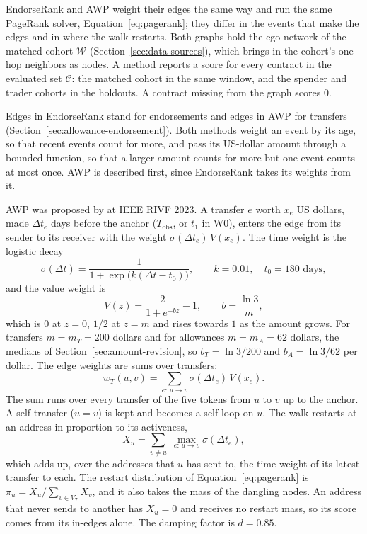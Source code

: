 
EndorseRank and AWP weight their edges the same way and run the same PageRank solver, Equation~\eqref{eq:pagerank}; they differ in the events that make the edges and in where the walk restarts. Both graphs hold the ego network of the matched cohort $\mathcal{W}$ (Section~\ref{sec:data-sources}), which brings in the cohort's one-hop neighbors as nodes. A method reports a score for every contract in the evaluated set $\mathcal{C}$: the matched cohort in the same window, and the spender and trader cohorts in the holdouts. A contract missing from the graph scores $0$.

Edges in EndorseRank stand for endorsements and edges in AWP for transfers (Section~\ref{sec:allowance-endorsement}). Both methods weight an event by its age, so that recent events count for more, and pass its US-dollar amount through a bounded function, so that a larger amount counts for more but one event counts at most once. AWP is described first, since EndorseRank takes its weights from it.


AWP was proposed by \textcite{do2023awp} at IEEE RIVF 2023. A transfer $e$ worth $x_e$ US dollars, made $\Delta t_e$ days before the anchor ($T_{\mathrm{obs}}$, or $t_1$ in W0), enters the edge from its sender to its receiver with the weight $\sigma(\Delta t_e)\,V(x_e)$. The time weight is the logistic decay
\begin{equation}
\label{eq:logistic-decay}
\sigma(\Delta t)
=
\frac{1}{1+\exp\bigl(k(\Delta t-t_0)\bigr)},
\qquad
k=0.01,\quad t_0=180\text{ days},
\end{equation}
and the value weight is
\begin{equation}
\label{eq:value-transform}
V(z)
=
\frac{2}{1+e^{-bz}}-1,
\qquad
b=\frac{\ln 3}{m},
\end{equation}
which is $0$ at $z=0$, $1/2$ at $z=m$ and rises towards $1$ as the amount grows. For transfers $m=m_T=200$ dollars and for allowances $m=m_A=62$ dollars, the medians of Section~\ref{sec:amount-revision}, so $b_T=\ln 3/200$ and $b_A=\ln 3/62$ per dollar. The edge weights are sums over transfers:
\begin{equation}
\label{eq:transfer-weight}
w_T(u,v)
=
\sum_{e:\,u\to v}
\sigma(\Delta t_e)\,V(x_e).
\end{equation}
The sum runs over every transfer of the five tokens from $u$ to $v$ up to the anchor. A self-transfer ($u=v$) is kept and becomes a self-loop on $u$. The walk restarts at an address in proportion to its activeness,
\begin{equation}
\label{eq:activeness}
X_u
=
\sum_{v\neq u}\;
\max_{e:\,u\to v}\sigma(\Delta t_e),
\end{equation}
which adds up, over the addresses that $u$ has sent to, the time weight of its latest transfer to each. The restart distribution of Equation~\eqref{eq:pagerank} is $\pi_u=X_u/\sum_{v\in V_T}X_v$, and it also takes the mass of the dangling nodes. An address that never sends to another has $X_u=0$ and receives no restart mass, so its score comes from its in-edges alone. The damping factor is $d=0.85$.

